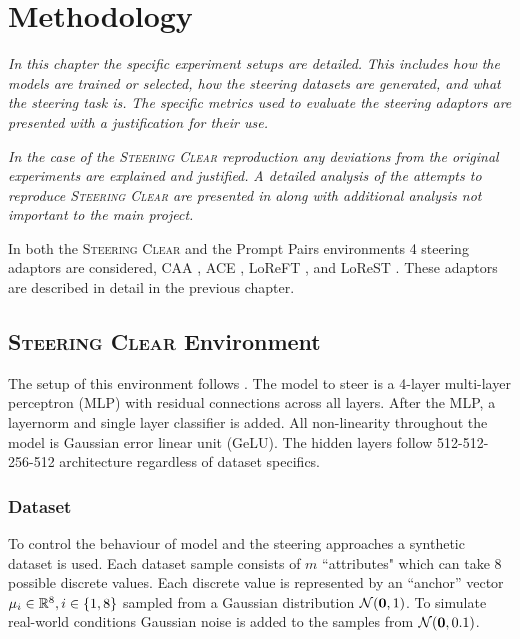 \chapter{Methodology}
\label{ch:methodology}

\emph{In this chapter the specific experiment setups are detailed.}
\emph{This includes how the models are trained or selected, how the steering datasets are generated, and what the steering task is.}
\emph{The specific metrics used to evaluate the steering adaptors are presented with a justification for their use.}

\emph{In the case of the {\scshape Steering Clear} \citep{steering-clear} reproduction any deviations from the original experiments are explained and justified.}
\emph{A detailed analysis of the attempts to reproduce {\scshape Steering Clear} are presented in  along with additional analysis not important to the main project.}

In both the {\scshape Steering Clear} and the Prompt Pairs environments 4 steering adaptors are considered, CAA \citep{caa}, ACE \citep{ace}, LoReFT \citep{reft}, and LoReST \citep{steering-clear}.
These adaptors are described in detail in the previous chapter.

\section{{\scshape Steering Clear} Environment}
\label{sec:steering-clear}

The setup of this environment follows \citep{steering-clear}.
The model to steer is a 4-layer multi-layer perceptron (MLP) with residual connections \citep{resnet} across all layers.
After the MLP, a layernorm \citep{layernorm} and single layer classifier is added.
All non-linearity throughout the model is Gaussian error linear unit (GeLU).
The hidden layers follow 512-512-256-512 architecture regardless of dataset specifics.

\subsection{Dataset}
\label{steering-clear:dataset}

To control the behaviour of model and the steering approaches a synthetic dataset is used.
Each dataset sample consists of $m$ ``attributes" which can take 8 possible discrete values.
Each discrete value is represented by an ``anchor'' vector $\mathbf{\mu}_i \in \mathbb{R}^8, i \in \{1,8\}$ sampled from a Gaussian distribution $\mathcal{N}(\mathbf{0}, 1)$.
To simulate real-world conditions Gaussian noise is added to the samples from $\mathcal{N}(\mathbf{0}, 0.1)$.

